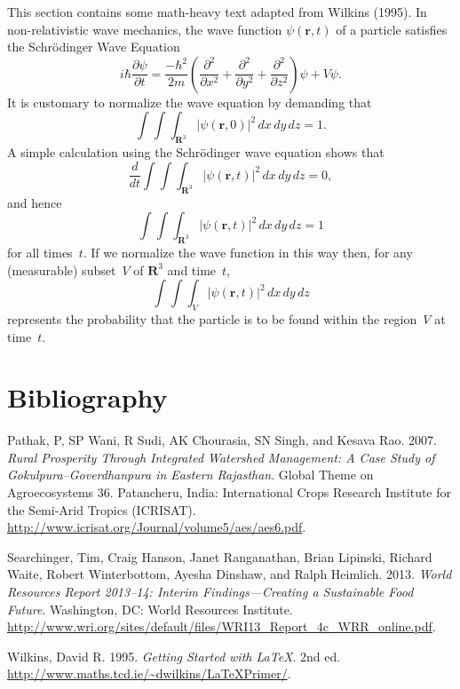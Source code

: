 \documentclass[letterpaper,             %
               oneside,                 %
               \pointsize]              %
               {memoir}
\newlength{\cslhangindent}
\newenvironment{CSLReferences}%
{\setlength{\parindent}{0pt}%
\everypar{\setlength{\hangindent}{\cslhangindent}}\ignorespaces}%
{\par}
\begin{document}
This section contains some math-heavy text adapted from Wilkins (1995).
In non-relativistic wave mechanics, the wave function
\(\psi(\mathbf{r},t)\) of a particle satisfies the Schrödinger Wave
Equation \[i\hbar\frac{\partial \psi}{\partial t}
    = \frac{-\hbar^2}{2m} \left(
    \frac{\partial^2}{\partial x^2}
    + \frac{\partial^2}{\partial y^2}
    + \frac{\partial^2}{\partial z^2}
    \right) \psi + V \psi.\] It is customary to normalize the wave
equation by demanding that \[\int \!\!\! \int \!\!\! \int_{\textbf{R}^3}
    \left| \psi(\mathbf{r},0) \right|^2\,dx\,dy\,dz = 1.\] A simple
calculation using the Schrödinger wave equation shows that
\[\frac{d}{dt} \int \!\!\! \int \!\!\! \int_{\textbf{R}^3}
    \left| \psi(\mathbf{r},t) \right|^2\,dx\,dy\,dz = 0,\] and hence
\[\int \!\!\! \int \!\!\! \int_{\textbf{R}^3}
    \left| \psi(\mathbf{r},t) \right|^2\,dx\,dy\,dz = 1\] for all
times~\(t\). If we normalize the wave function in this way then, for any
(measurable) subset~\(V\) of \(\textbf{R}^3\) and time~\(t\),
\[\int \!\!\! \int \!\!\! \int_V
    \left| \psi(\mathbf{r},t) \right|^2\,dx\,dy\,dz\] represents the
probability that the particle is to be found within the region~\(V\) at
time~\(t\).


\hypertarget{bibliography}{%
\chapter*{Bibliography}\label{bibliography}}


\hypertarget{refs}{}
\begin{CSLReferences}{1}{0}
\leavevmode{}%
Pathak, P, SP Wani, R Sudi, AK Chourasia, SN Singh, and Kesava Rao.
2007. \emph{Rural Prosperity Through Integrated Watershed Management: A
Case Study of Gokulpura--Goverdhanpura in Eastern Rajasthan}. Global
Theme on Agroecosystems 36. Patancheru, India: International Crops
Research Institute for the Semi-Arid Tropics ({ICRISAT}).
\url{http://www.icrisat.org/Journal/volume5/aes/aes6.pdf}.

\leavevmode{}%
Searchinger, Tim, Craig Hanson, Janet Ranganathan, Brian Lipinski,
Richard Waite, Robert Winterbottom, Ayesha Dinshaw, and Ralph Heimlich.
2013. \emph{World Resources Report 2013--14: Interim Findings---Creating
a Sustainable Food Future}. Washington, {DC}: World Resources Institute.
\url{http://www.wri.org/sites/default/files/WRI13_Report_4c_WRR_online.pdf}.

\leavevmode{}%
Wilkins, David R. 1995. \emph{Getting Started with LaTeX}. 2nd ed.
\url{http://www.maths.tcd.ie/~dwilkins/LaTeXPrimer/}.

\end{CSLReferences}
\end{document}
